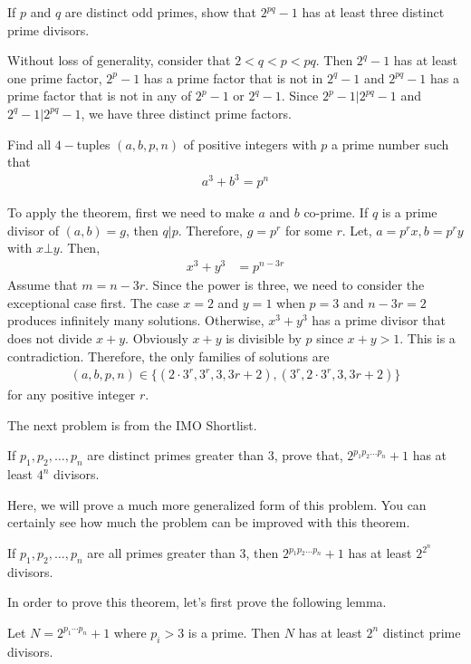 \documentclass{subfile}
\begin{document}
		\begin{problem}
			If $p$ and $q$ are distinct odd primes, show that $2^{pq}-1$ has at least three distinct prime divisors.
		\end{problem}

		\begin{solution}
			Without loss of generality, consider that $2<q<p<pq$. Then $2^q-1$ has at least one prime factor, $2^p-1$ has a prime factor that is not in $2^q-1$ and $2^{pq}-1$ has a prime factor that is not in any of $2^p-1$ or $2^q-1$. Since $2^p-1|2^{pq}-1$ and $2^{q}-1|2^{pq}-1$, we have three distinct prime factors.
		\end{solution}


		\begin{problem}
			Find all $4-$tuples $(a,b,p,n)$ of positive integers with $p$ a prime number such that
				\begin{align*}
					a^3+b^3=p^n
				\end{align*}
		\end{problem}

		\begin{solution}
			To apply the theorem, first we need to make $a$ and $b$ co-prime. If $q$ is a prime divisor of $(a,b)=g$, then $q|p$. Therefore, $g=p^r$ for some $r$. Let, $a=p^rx,b=p^ry$ with $x\bot y$. Then,
				\begin{align*}
					x^3+y^3 & = p^{n-3r}
				\end{align*}
			Assume that $m=n-3r$. Since the power is three, we need to consider the exceptional case first. The case $x=2$ and $y=1$ when $p=3$ and $n-3r=2$ produces infinitely many solutions. Otherwise, $x^3+y^3$ has a prime divisor that does not divide $x+y$. Obviously $x+y$ is divisible by $p$ since $x+y>1$. This is a contradiction. Therefore, the only families of solutions are
				\begin{align*}
					(a,b,p,n)\in\{(2\cdot 3^r,3^r,3,3r+2),(3^r,2\cdot 3^r,3,3r+2)\}
				\end{align*}
			for any positive integer $r$.
		\end{solution}

	The next problem is from the IMO Shortlist.
		\begin{problem}
			If $p_1,p_2,\dots,p_n$ are distinct primes greater than $3$, prove that, $2^{p_1p_2\dots p_n}+1$ has at least $4^n$ divisors.
		\end{problem}
	Here, we will prove a much more generalized form of this problem.  You can certainly see how much the problem can be improved with this theorem.
		\begin{theorem}
			If $p_1,p_2,\dots,p_n$ are all primes greater than $3$, then $2^{p_1p_2\dots p_n}+1$ has at least $2^{2^n}$ divisors.
		\end{theorem}
	In order to prove this theorem, let's first prove the following lemma.
		\begin{lemma}
			Let $N=2^{p_1\cdots p_n}+1$ where $p_i>3$ is a prime. Then $N$ has at least $2^n$ distinct prime divisors.
		\end{lemma}
\end{document}

